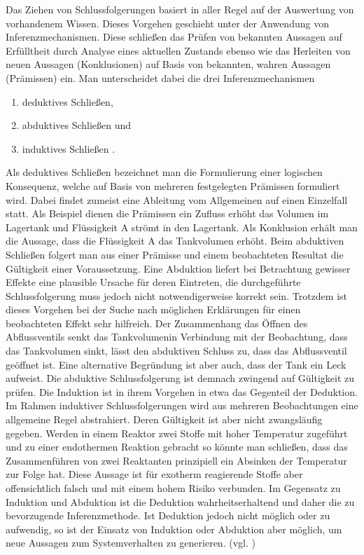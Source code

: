 Das Ziehen von Schlussfolgerungen basiert in aller Regel auf der Auswertung von vorhandenem Wissen. Dieses Vorgehen geschieht unter der Anwendung von \glqq Inferenzmechanismen\grqq { }. Diese schlie\ss{}en das Pr\"ufen von bekannten Aussagen auf Erf\"ulltheit durch Analyse eines aktuellen Zustands ebenso wie das Herleiten von neuen Aussagen (Konklusionen) auf Basis von bekannten, wahren Aussagen (Pr\"amissen) ein. Man unterscheidet dabei die drei Inferenzmechanismen \begin{enumerate}
\item deduktives Schlie\ss{}en,
\item abduktives Schlie\ss{}en und
\item induktives Schlie\ss{}en .
\end{enumerate} 
Als deduktives Schlie\ss{}en bezeichnet man die Formulierung einer logischen Konsequenz, welche auf Basis von mehreren festgelegten Pr\"amissen formuliert wird. Dabei findet zumeist eine Ableitung vom Allgemeinen auf einen Einzelfall statt. Als Beispiel dienen die Pr\"amissen ein Zufluss erh\"oht das Volumen im Lagertank und Fl\"ussigkeit A str\"omt in den Lagertank. Als Konklusion erh\"alt man die Aussage, dass die Fl\"ussigkeit A das Tankvolumen erh\"oht. \newline
Beim abduktiven Schlie\ss{}en folgert man aus einer Pr\"amisse und einem beobachteten Resultat die G\"ultigkeit einer Voraussetzung. Eine Abduktion liefert bei Betrachtung gewisser Effekte eine plausible Ursache f\"ur deren Eintreten, die durchgef\"uhrte Schlussfolgerung muss jedoch nicht notwendigerweise korrekt sein. Trotzdem ist dieses Vorgehen bei der Suche nach m\"oglichen Erkl\"arungen f\"ur einen beobachteten Effekt sehr hilfreich. Der Zusammenhang \glqq das \"Offnen des Abflussventils senkt das Tankvolumen\grqq { }in Verbindung mit der Beobachtung, dass das Tankvolumen sinkt, l\"asst den abduktiven Schluss zu, dass das Abflussventil ge\"offnet ist. Eine alternative Begr\"undung ist aber auch, dass der Tank ein Leck aufweist. Die abduktive Schlussfolgerung ist demnach zwingend auf G\"ultigkeit zu pr\"ufen. \newline
Die Induktion ist in ihrem Vorgehen in etwa das Gegenteil der Deduktion. Im Rahmen induktiver Schlussfolgerungen wird aus mehreren Beobachtungen eine allgemeine Regel abstrahiert. Deren G\"ultigkeit ist aber nicht zwangsl\"aufig gegeben. Werden in einem Reaktor zwei Stoffe mit hoher Temperatur zugef\"uhrt und zu einer endothermen Reaktion gebracht so k\"onnte man schlie\ss{}en, dass das Zusammenf\"uhren von zwei Reaktanten prinzipiell ein Absinken der Temperatur zur Folge hat. Diese Aussage ist f\"ur exotherm reagierende Stoffe aber offensichtlich falsch und mit einem hohem Risiko verbunden. \newline
Im Gegensatz zu Induktion und Abduktion ist die Deduktion wahrheitserhaltend und daher die zu bevorzugende Inferenzmethode. Ist Deduktion jedoch nicht m\"oglich oder zu aufwendig, so ist der Einsatz von Induktion oder Abduktion aber m\"oglich, um neue Aussagen zum Systemverhalten zu generieren. {(vgl. \cite[S. 28 ff.]{Dengel_2012})}


